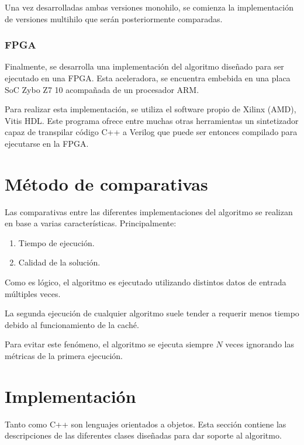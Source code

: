 Una vez desarrolladas ambas versiones monohilo,
se comienza la implementación de versiones multihilo
que serán posteriormente comparadas.

\subsubsection{FPGA}

Finalmente, se desarrolla una implementación del algoritmo
diseñado para ser ejecutado en una FPGA\@.
Esta aceleradora, se encuentra embebida en una placa SoC
Zybo Z7 10 acompañada de un procesador ARM\@.

Para realizar esta implementación,
se utiliza el software propio de Xilinx (AMD),
Vitis HDL\@.
Este programa ofrece entre muchas otras herramientas
un sintetizador capaz de transpilar código C++ a Verilog
que puede ser entonces compilado
para ejecutarse en la FPGA\@.

\section{Método de comparativas}

Las comparativas entre las diferentes implementaciones
del algoritmo se realizan en base a varias características.
Principalmente:

\begin{enumerate}[itemsep=0.25px]
    \item Tiempo de ejecución.
    \item Calidad de la solución.
\end{enumerate}

Como es lógico, el algoritmo es ejecutado utilizando
distintos datos de entrada múltiples veces.

\begin{notebox}
    La segunda ejecución de cualquier algoritmo suele tender a
    requerir menos tiempo debido al funcionamiento de la caché.
    
    Para evitar este fenómeno, el algoritmo se ejecuta
    siempre $N$ veces ignorando las métricas de la primera ejecución.
\end{notebox}

\section{Implementación}

Tanto \Python como C++ son lenguajes orientados a objetos.
Esta sección contiene las descripciones de las diferentes
clases diseñadas para dar soporte al algoritmo.

